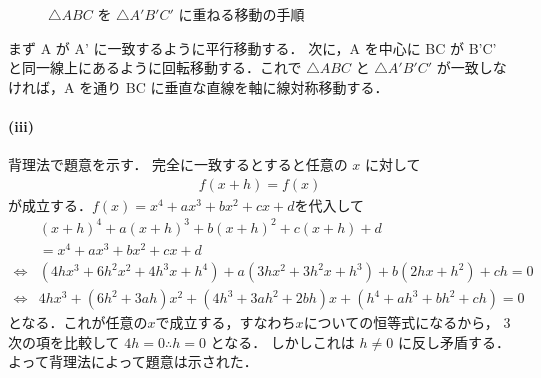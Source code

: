 \documentclass[../../main.tex]{subfiles}
\begin{document}
\begin{figure}[htb]
  \caption{$\triangle ABC$ を $\triangle A'B'C'$ に重ねる移動の手順}
  \label{fig:1961_1_triangle_motions}
\end{figure}

まず A が A' に一致するように平行移動する．
次に，A を中心に BC が B'C' と同一線上にあるように回転移動する．これで $\triangle ABC$ と $\triangle A'B'C'$ が一致しなければ，A を通り BC に垂直な直線を軸に線対称移動する．

\paragraph{(iii)}

背理法で題意を示す．
完全に一致するとすると任意の $x$ に対して
\begin{align}
  f(x+h) = f(x)
\end{align}
が成立する．$f(x)=x^4+ax^3+bx^2+cx+d$を代入して
\begin{align}
  &(x+h)^4 + a(x+h)^3 + b(x+h)^2 + c(x+h) + d \\
  &= x^4 + ax^3 + bx^2 + cx + d \\
  \iff
  &(4h x^3 + 6h^2 x^2 + 4h^3 x + h^4) + a(3h x^2 + 3h^2 x + h^3) + b(2hx + h^2) + ch = 0 \\
  \iff
  &4hx^3 + (6h^2+3ah)x^2 + (4h^3+3ah^2+2bh)x + (h^4+ah^3+bh^2+ch) = 0
\end{align}
となる．これが任意の$x$で成立する，すなわち$x$についての恒等式になるから，
$3$ 次の項を比較して $4h = 0 \therefore h=0$ となる．
しかしこれは $h \neq 0$ に反し矛盾する．
よって背理法によって題意は示された．

\newpage
\end{document}
